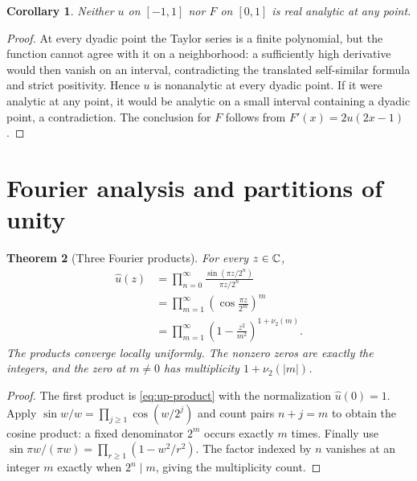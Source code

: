 \documentclass[11pt]{article}
\newtheorem{theorem}{Theorem}[section]
\newtheorem{corollary}[theorem]{Corollary}
\theoremstyle{definition}
\theoremstyle{remark}
\begin{document}
\begin{corollary}\label{cor:nowhere-analytic}
Neither $u$ on $[-1,1]$ nor $F$ on $[0,1]$ is real analytic at any point.
\end{corollary}
\begin{proof}
At every dyadic point the Taylor series is a finite polynomial, but the function cannot agree with it on a neighborhood: a sufficiently high derivative would then vanish on an interval, contradicting the translated self-similar formula and strict positivity.  Hence $u$ is nonanalytic at every dyadic point.  If it were analytic at any point, it would be analytic on a small interval containing a dyadic point, a contradiction.  The conclusion for $F$ follows from $F'(x)=2u(2x-1)$.
\end{proof}

\section{Fourier analysis and partitions of unity}\label{sec:fourier}
\begin{theorem}[Three Fourier products]\label{thm:fourier-products}
For every $z\in\mathbb C$,
\begin{equation}\label{eq:three-products}
\begin{aligned}
 \widehat u(z)
 &=\prod_{n=0}^{\infty}\frac{\sin(\pi z/2^n)}{\pi z/2^n}\\
 &=\prod_{m=1}^{\infty}\left(\cos\frac{\pi z}{2^m}\right)^m\\
 &=\prod_{m=1}^{\infty}
 \left(1-\frac{z^2}{m^2}\right)^{1+\nu_2(m)}.
\end{aligned}
\end{equation}
The products converge locally uniformly.  The nonzero zeros are exactly the integers, and the zero at $m\ne0$ has multiplicity $1+\nu_2(|m|)$.
\end{theorem}
\begin{proof}
The first product is \eqref{eq:up-product} with the normalization $\widehat u(0)=1$.  Apply
$\sin w/w=\prod_{j\ge1}\cos(w/2^j)$ and count pairs $n+j=m$ to obtain the cosine product: a fixed denominator $2^m$ occurs exactly $m$ times.  Finally use
$\sin\pi w/(\pi w)=\prod_{r\ge1}(1-w^2/r^2)$.  The factor indexed by $n$ vanishes at an integer $m$ exactly when $2^n\mid m$, giving the multiplicity count.
\end{proof}
\end{document}
